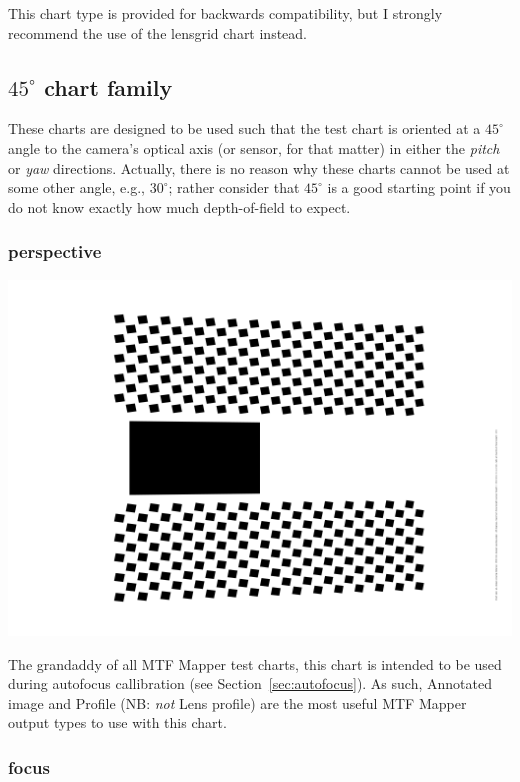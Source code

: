 \documentclass[a4paper]{article}
\begin{document}
This chart type is provided for backwards compatibility, but I strongly
recommend the use of the \textsf{lensgrid} chart instead.

\subsection{$45^\circ$ chart family}
These charts are designed to be used such that the test chart is oriented at
a $45^\circ$ angle to the camera's optical axis (or sensor, for that matter)
in either the \emph{pitch} or \emph{yaw} directions. Actually, there is no
reason why these charts cannot be used at some other angle, e.g.,
$30^\circ$; rather consider that $45^\circ$ is a good starting point if you
do not know exactly how much depth-of-field to expect.

\subsubsection{perspective}
\label{sec:perspective_chart}

\parbox{\textwidth}{
\centering
\includegraphics[width=\textwidth]{figures/chart_perspective}
}
\vspace{1ex}

The grandaddy of all MTF Mapper test charts, this chart is intended to be
used during autofocus callibration (see Section~\ref{sec:autofocus}). As
such, \textsf{Annotated image} and \textsf{Profile} (NB: \emph{not}
\textsf{Lens profile}) are the most useful MTF Mapper output types to use
with this chart.

\subsubsection{focus}
\end{document}
